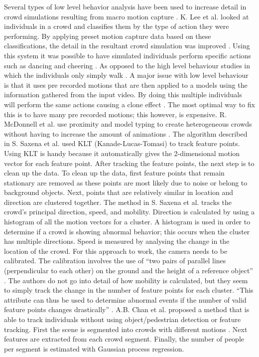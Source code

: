 \documentclass[12pt, twocolumn, conference]{IEEEtran}
\begin{document}
Several types of low level behavior analysis have been used to increase detail in crowd simulations resulting from macro motion capture \cite{K. Lee}. K. Lee et al. looked at individuals in a crowd and classifies them by the type of action they were performing. By applying preset motion capture data based on these classifications, the detail in the resultant crowd simulation was improved \cite{K. Lee}. 
Using this system it was possible to have simulated individuals perform specific actions such as dancing and cheering \cite{K. Lee}. As opposed to the high level behaviour studies in which the individuals only simply walk \cite{N. Courty}\cite{R. Mehran}.
A major issue with low level behaviour is that it uses pre recorded motions that are then applied to a models using the information gathered from the input video. By doing this multiple individuals will perform the same actions causing a clone effect \cite{R. McDonnell}. The most optimal way to fix this is to have many pre recorded motions; this however, is expensive. R. McDonnell et al. use proximity and model typing to create heterogeneous crowds without having to increase the amount of animations \cite{R. McDonnell}.
The algorithm described in S. Saxena et al. used KLT (Kanade-Lucas-Tomasi) to track feature points. Using KLT is handy because it automatically gives the 2-dimensional motion vector for each feature point. After tracking the feature points, the next step is to clean up the data. To clean up the data, first feature points that remain stationary are removed as these points are most likely due to noise or belong to background objects. Next, points that are relatively similar in location and direction are clustered together.
The method in S. Saxena et al. tracks the crowd’s principal direction, speed, and mobility. Direction is calculated by using a histogram of all the motion vectors for a cluster. A histogram is used in order to determine if a crowd is showing abnormal behavior; this occurs when the cluster has multiple directions. Speed is measured by analysing the change in the location of the crowd. For this approach to work, the camera needs to be calibrated. The calibration involves the use of “two pairs of parallel lines (perpendicular to each other) on the ground and the height of a reference object” \cite{S. Saxena}. The authors do not go into detail of how mobility is calculated, but they seem to simply track the change in the number of feature points for each cluster. “This attribute can thus be used to determine abnormal events if the number of valid feature points changes drastically” \cite{S. Saxena}.
A.B. Chan et al. proposed a method that is able to track individuals without using  object/pedestrian detection or feature tracking. First the scene is segmented into crowds with different motions \cite{A.B. Chan}. Next features are extracted from each crowd segment. Finally, the number of people per segment is estimated with Gaussian process regression.
\end{document}
